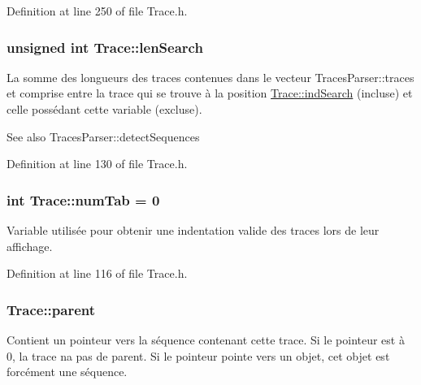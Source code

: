 Definition at line 250 of file Trace.\+h.

\subsubsection[{\texorpdfstring{len\+Search}{lenSearch}}]{\setlength{\rightskip}{0pt plus 5cm}unsigned int Trace\+::len\+Search}\hypertarget{class_trace_a37d1196b3efa0038af8dcbb7701fcd91}{}\label{class_trace_a37d1196b3efa0038af8dcbb7701fcd91}
La somme des longueurs des traces contenues dans le vecteur Traces\+Parser\+::traces et comprise entre la trace qui se trouve à la position \hyperlink{class_trace_ae1aa55b6282f5dae12f63b0282ef4b9d}{Trace\+::ind\+Search} (incluse) et celle possédant cette variable (excluse).

\begin{DoxySeeAlso}{See also}
Traces\+Parser\+::detect\+Sequences 
\end{DoxySeeAlso}


Definition at line 130 of file Trace.\+h.

\subsubsection[{\texorpdfstring{num\+Tab}{numTab}}]{\setlength{\rightskip}{0pt plus 5cm}int Trace\+::num\+Tab = 0\hspace{0.3cm}{\ttfamily [static]}}\hypertarget{class_trace_a21ee84e87f59ed66eb6fa505cc6bf637}{}\label{class_trace_a21ee84e87f59ed66eb6fa505cc6bf637}
Variable utilisée pour obtenir une indentation valide des traces lors de leur affichage. 

Definition at line 116 of file Trace.\+h.

\subsubsection[{\texorpdfstring{parent}{parent}}]{ Trace\+::parent\hspace{0.3cm}{\ttfamily [protected]}}\hypertarget{class_trace_a52648b4a6c117072f5797c0e31518f24}{}\label{class_trace_a52648b4a6c117072f5797c0e31518f24}
Contient un pointeur vers la séquence contenant cette trace. Si le pointeur est à 0, la trace n\textquotesingle{}a pas de parent. Si le pointeur pointe vers un objet, cet objet est forcément une séquence. 

